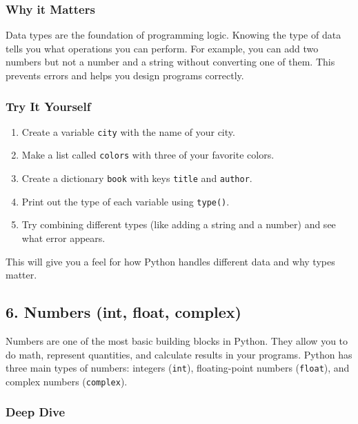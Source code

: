 \documentclass[
  letterpaper,
  DIV=11,
  numbers=noendperiod]{scrreprt}
\providecommand{\tightlist}{%
  \setlength{\itemsep}{0pt}\setlength{\parskip}{0pt}}
\begin{document}
\subsubsection{Why it Matters}\label{why-it-matters-5}

Data types are the foundation of programming logic. Knowing the type of
data tells you what operations you can perform. For example, you can add
two numbers but not a number and a string without converting one of
them. This prevents errors and helps you design programs correctly.

\subsubsection{Try It Yourself}\label{try-it-yourself-5}

\begin{enumerate}
\def\labelenumi{\arabic{enumi}.}
\tightlist
\item
  Create a variable \texttt{city} with the name of your city.
\item
  Make a list called \texttt{colors} with three of your favorite colors.
\item
  Create a dictionary \texttt{book} with keys \texttt{title} and
  \texttt{author}.
\item
  Print out the type of each variable using \texttt{type()}.
\item
  Try combining different types (like adding a string and a number) and
  see what error appears.
\end{enumerate}

This will give you a feel for how Python handles different data and why
types matter.

\subsection{6. Numbers (int, float,
complex)}\label{numbers-int-float-complex}

Numbers are one of the most basic building blocks in Python. They allow
you to do math, represent quantities, and calculate results in your
programs. Python has three main types of numbers: integers
(\texttt{int}), floating-point numbers (\texttt{float}), and complex
numbers (\texttt{complex}).

\subsubsection{Deep Dive}\label{deep-dive-6}
\end{document}
